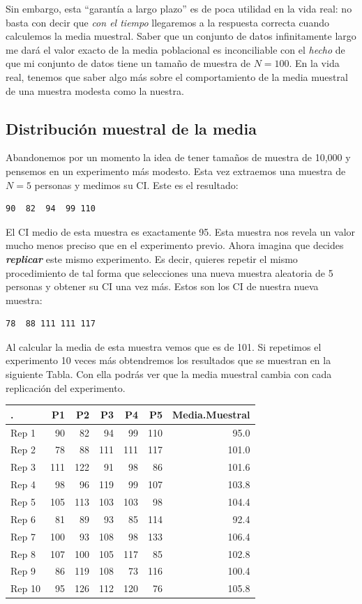 \documentclass[spanish,]{book}
\begin{document}
Sin embargo, esta ``garantía a largo plazo'' es de poca utilidad en la
vida real: no basta con decir que \emph{con el tiempo} llegaremos a la
respuesta correcta cuando calculemos la media muestral. Saber que un
conjunto de datos infinitamente largo me dará el valor exacto de la
media poblacional es inconciliable con el \emph{hecho} de que mi
conjunto de datos tiene un tamaño de muestra de \(N=100\). En la vida
real, tenemos que saber algo más sobre el comportamiento de la media
muestral de una muestra modesta como la nuestra.

\subsection{Distribución muestral de la media}\label{samplingdists}

Abandonemos por un momento la idea de tener tamaños de muestra de 10,000
y pensemos en un experimento más modesto. Esta vez extraemos una muestra
de \(N=5\) personas y medimos su CI. Este es el resultado:

\begin{verbatim}
90  82  94  99 110
\end{verbatim}

El CI medio de esta muestra es exactamente 95. Esta muestra nos revela
un valor mucho menos preciso que en el experimento previo. Ahora imagina
que decides \textbf{\emph{replicar}} este mismo experimento. Es decir,
quieres repetir el mismo procedimiento de tal forma que selecciones una
nueva muestra aleatoria de 5 personas y obtener su CI una vez más. Estos
son los CI de nuestra nueva muestra:

\begin{verbatim}
78  88 111 111 117
\end{verbatim}

Al calcular la media de esta muestra vemos que es de 101. Si repetimos
el experimento 10 veces más obtendremos los resultados que se muestran
en la siguiente Tabla. Con ella podrás ver que la media muestral cambia
con cada replicación del experimento.

\begin{tabular}{l|r|r|r|r|r|r}
\hline
. & P1 & P2 & P3 & P4 & P5 & Media.Muestral\\
\hline
Rep 1 & 90 & 82 & 94 & 99 & 110 & 95.0\\
\hline
Rep 2 & 78 & 88 & 111 & 111 & 117 & 101.0\\
\hline
Rep 3 & 111 & 122 & 91 & 98 & 86 & 101.6\\
\hline
Rep 4 & 98 & 96 & 119 & 99 & 107 & 103.8\\
\hline
Rep 5 & 105 & 113 & 103 & 103 & 98 & 104.4\\
\hline
Rep 6 & 81 & 89 & 93 & 85 & 114 & 92.4\\
\hline
Rep 7 & 100 & 93 & 108 & 98 & 133 & 106.4\\
\hline
Rep 8 & 107 & 100 & 105 & 117 & 85 & 102.8\\
\hline
Rep 9 & 86 & 119 & 108 & 73 & 116 & 100.4\\
\hline
Rep 10 & 95 & 126 & 112 & 120 & 76 & 105.8\\
\hline
\end{tabular}
\end{document}
